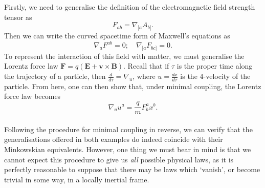 \documentclass[11pt,fleqn]{report}
\begin{document}
\begin{example}[Electromagnetism]
	Firstly, we need to generalise the definition of the electromagnetic field strength tensor as
		\begin{equation}\label{key}
			F_{ab} = \nabla_{[a} A_{b]}.
		\end{equation}
	Then we can write the curved spacetime form of Maxwell's equations as
		\begin{equation}\label{key}
			\nabla_a F^{ab} = 0; \quad \nabla_{[a} F_{bc]} = 0.
		\end{equation}
	To represent the interaction of this field with matter, we must generalise the Lorentz force law $ \mathbf{F} = q (\mathbf{E} + \mathbf{v} \times \mathbf{B} ) $. Recall that if $ \tau $ is the proper time along the trajectory of a particle, then $ \tfrac{d}{d\tau} = \nabla_u $, where $ u = \tfrac{dx}{d\tau} $ is the 4-velocity of the particle. From here, one can then show that, under minimal coupling, the Lorentz force law becomes
		\begin{equation}\label{key}
			\nabla_u u^a = \frac{q}{m} F^a_b x^b.
		\end{equation}
\end{example}

\paragraph{}
Following the procedure for minimal coupling in reverse, we can verify that the generalisations offered in both examples do indeed coincide with their Minkowskian equivalents.
However, one thing we must bear in mind is that we cannot expect this procedure to give us \textit{all} possible physical laws, as it is perfectly reasonable to suppose that there may be laws which `vanish', or become trivial in some way, in a locally inertial frame.
\end{document}
